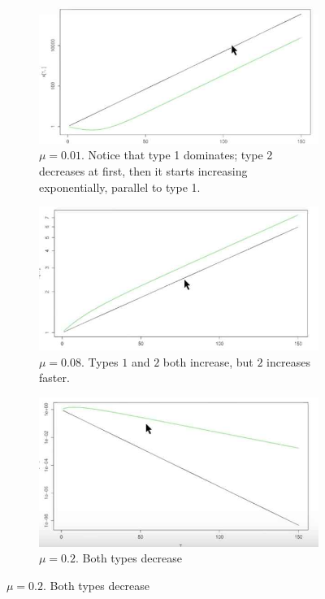 \documentclass[]{article}
\begin{document}
\begin{figure}[H]
	\caption{Log-log plot of $\vec{x}$}
	\begin{subfigure}[t]{0.3\textwidth}
		\caption{$\mu=0.01$. Notice that type 1 dominates; type 2 decreases at first, then it starts increasing exponentially, parallel to type 1.}\label{fig:growth4}
		\includegraphics[width=\textwidth]{growth4}
	\end{subfigure}
	\;\;
	\begin{subfigure}[t]{0.3\textwidth}
		\caption{$\mu=0.08$. Types $1$ and $2$ both increase, but $2$ increases faster.}\label{fig:growth5}
		\includegraphics[width=\textwidth]{growth5}
	\end{subfigure}
	\;\;
	\begin{subfigure}[t]{0.3\textwidth}
		\caption{$\mu=0.2$. Both types decrease}\label{fig:growth6}
		\includegraphics[width=\textwidth]{growth6}
	\end{subfigure}
\end{figure}
\end{document}
